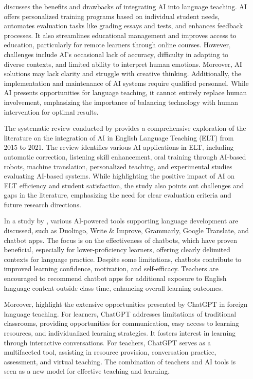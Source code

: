 \textcite[p.~119–120]{ravshanovna2023} discusses the benefits and drawbacks of
integrating AI into language teaching. AI offers personalized training
programs based on individual student needs, automates evaluation tasks
like grading essays and tests, and enhances feedback processes. It also
streamlines educational management and improves access to education,
particularly for remote learners through online courses. However,
challenges include AI's occasional lack of accuracy,
difficulty in adapting to diverse contexts, and limited ability to
interpret human emotions. Moreover, AI solutions may lack clarity and
struggle with creative thinking. Additionally, the implementation and
maintenance of AI systems require qualified personnel. While AI presents
opportunities for language teaching, it cannot entirely replace human
involvement, emphasizing the importance of balancing technology with
human intervention for optimal results.

The systematic review conducted by \textcite{sharadgah2022} provides a
comprehensive exploration of the literature on the integration of AI in
English Language Teaching (ELT) from 2015 to 2021. The review identifies
various AI applications in ELT, including automatic correction,
listening skill enhancement, oral training through AI-based robots,
machine translation, personalized teaching, and experimental studies
evaluating AI-based systems. While highlighting the positive impact of
AI on ELT efficiency and student satisfaction, the study also points out
challenges and gaps in the literature, emphasizing the need for clear
evaluation criteria and future research directions.

In a study by \textcite[p.~449]{hockly2023}, various AI-powered tools supporting
language development are discussed, such as Duolingo, Write \& Improve,
Grammarly, Google Translate, and chatbot apps. The focus is on the
effectiveness of chatbots, which have proven beneficial, especially for
lower-proficiency learners, offering clearly delimited contexts for
language practice. Despite some limitations, chatbots contribute to
improved learning confidence, motivation, and self-efficacy. Teachers
are encouraged to recommend chatbot apps for additional exposure to
English language content outside class time, enhancing overall learning
outcomes.

Moreover, \textcite[p.~78]{huang2023} highlight the extensive
opportunities presented by ChatGPT in foreign language teaching. For
learners, ChatGPT addresses limitations of traditional classrooms,
providing opportunities for communication, easy access to learning
resources, and individualized learning strategies. It fosters interest
in learning through interactive conversations. For teachers, ChatGPT
serves as a multifaceted tool, assisting in resource provision,
conversation practice, assessment, and virtual teaching. The combination
of teachers and AI tools is seen as a new model for effective teaching
and learning.

